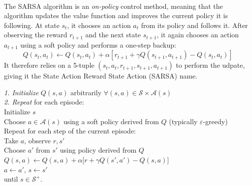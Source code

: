 \documentclass[a4paper]{report}
\begin{document}
{{{				\paragraph{} The SARSA algorithm is an \emph{on-policy} control method, meaning that the algorithm updates the value function and improves the current policy it is following. At state $s_t$, it chooses an action $a_t$ from its policy and follows it. After observing the reward $r_{t+1}$ and the next state $s_{t+1}$, it again chooses an action $a_{t+1}$ using a soft policy and performs a one-step backup: 
				\begin{equation}
					Q(s_t,a_t) \leftarrow Q(s_t,a_t) + \alpha\left[r_{t+1} + \gamma Q(s_{t+1},a_{t+1}) - Q(s_t,a_t)\right]
				\end{equation}
				It therefore relies on a 5-tuple $(s_t,a_t,r_{t+1},s_{t+1},a_{t+1})$ to perform the udpate, giving it the State Action Reward State Action (SARSA) name. 
				\vspace{10pt}
				
					{
						\begin{algorithm}[H]
	 					\SetAlgoLined
						\LinesNumbered
						\emph{\textsf{1. Initialize}} $Q(s,a)$ arbitrarily $\forall (s,a)\in\mathcal{S}\times\mathcal{A}(s)$ \\
						\BlankLine
						\BlankLine
						\emph{\textsf{2. Repeat}} for each episode: \\
						\Indp \Indp 
							Initialize $s$ \\
							Choose $a\in\mathcal{A}(s)$ using a soft policy derived from $Q$ (typically $\varepsilon$-greedy) \\
							Repeat for each step of the current episode:   \\
							\Indp \Indp 
								Take $a$, observe $r,s'$ \\
								Choose $a'$ from $s'$ using policy derived from $Q$ 
								$ Q(s,a) \longleftarrow Q(s,a) + \alpha\big[ r + \gamma Q(s',a') - Q(s,a) \big]$ \\
								$a\leftarrow a'$, $s\leftarrow s' $ \\
								
							\Indm \Indm 
						until $s\in\mathcal{S}^+$.
						\Indm \Indm 
						\end{algorithm}
					}
					
}}}
\end{document}
